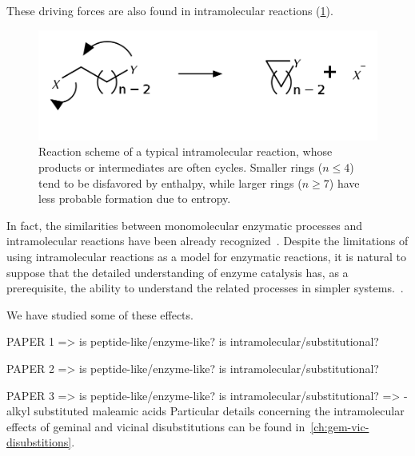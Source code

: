 These driving forces are also found in intramolecular reactions (\cref{fig:reacoes-intramoleculares}).
%
\begin{figure}[hbtp]
	\centering
	\includegraphics[width=.6\textwidth]{figures/reacao-intramolecular}
	\caption[Typical scheme of an intramolecular reactions]{
		Reaction scheme of a typical intramolecular reaction, whose products or
		intermediates are often cycles.
		Smaller rings ($n \le 4 $)
		tend to be disfavored by enthalpy, while larger rings ($n \ge 7 $)
		have less probable formation due to entropy.}%
	\label{fig:reacoes-intramoleculares}
\end{figure}
%
In fact, the similarities between monomolecular enzymatic processes and
intramolecular reactions have been already recognized~\cite{Nilsson_1933,Bruice_1960b,Jung_1990}.
Despite the limitations of using intramolecular reactions as a model for
enzymatic reactions, it is natural to suppose that the detailed understanding
of enzyme catalysis has, as a prerequisite, the ability to understand the
related processes in simpler systems.~\cite{Kirby_1972}.

We have studied some of these effects.

PAPER 1 => is peptide-like/enzyme-like? is intramolecular/substitutional?

PAPER 2 => is peptide-like/enzyme-like? is intramolecular/substitutional?

PAPER 3 => is peptide-like/enzyme-like? is intramolecular/substitutional?
=> \emph{}-alkyl substituted maleamic acids
Particular details concerning the intramolecular effects of geminal and
vicinal disubstitutions can be found in~\cref{ch:gem-vic-disubstitions}.
